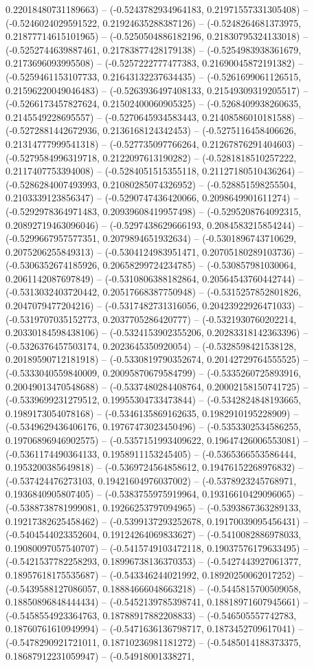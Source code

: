 0.22018480731189663) -- (-0.5243782934964183, 0.21971557331305408) -- (-0.5246024029591522, 0.21924635288387126) -- (-0.5248264681373975, 0.21877714615101965) -- (-0.5250504886182196, 0.21830795324133018) -- (-0.5252744639887461, 0.21783877428179138) -- (-0.5254983938361679, 0.2173696093995508) -- (-0.5257222777477383, 0.21690045872191382) -- (-0.5259461153107733, 0.21643132237634435) -- (-0.5261699061126515, 0.21596220049046483) -- (-0.5263936497408133, 0.21549309319205517) -- (-0.5266173457827624, 0.21502400060905325) -- (-0.5268409938260635, 0.2145549228695557) -- (-0.5270645934583443, 0.21408586010181588) -- (-0.5272881442672936, 0.2136168124342453) -- (-0.5275116458406626, 0.21314777999541318) -- (-0.527735097766264, 0.21267876291404603) -- (-0.5279584996319718, 0.2122097613190282) -- (-0.5281818510257222, 0.2117407753394008) -- (-0.5284051515355118, 0.21127180510436264) -- (-0.5286284007493993, 0.21080285074326952) -- (-0.528851598255504, 0.2103339123856347) -- (-0.5290747436420066, 0.2098649901611274) -- (-0.5292978364971483, 0.20939608419957498) -- (-0.5295208764092315, 0.20892719463096046) -- (-0.5297438629666193, 0.2084583215854244) -- (-0.5299667957577351, 0.2079894651932634) -- (-0.5301896743710629, 0.2075206255849313) -- (-0.5304124983951471, 0.20705180289103736) -- (-0.5306352674185926, 0.20658299724234785) -- (-0.530857981030064, 0.2061142087697849) -- (-0.5310806388182864, 0.20564543760442744) -- (-0.5313032403720442, 0.20517668387750948) -- (-0.5315257852801826, 0.2047079477204216) -- (-0.5317482731316056, 0.20423922926471033) -- (-0.5319707035152773, 0.2037705286420777) -- (-0.5321930760202214, 0.20330184598438106) -- (-0.5324153902355206, 0.20283318142363396) -- (-0.5326376457503174, 0.2023645350920054) -- (-0.5328598421538128, 0.20189590712181918) -- (-0.5330819790352674, 0.20142729764555525) -- (-0.5333040559840009, 0.20095870679584799) -- (-0.5335260725893916, 0.20049013470548688) -- (-0.5337480284408764, 0.20002158150741725) -- (-0.5339699231279512, 0.19955304733473844) -- (-0.5342824848193665, 0.1989173054078168) -- (-0.5346135869162635, 0.1982910195228909) -- (-0.5349629436406176, 0.19767473023450496) -- (-0.5353302534586255, 0.19706896946902575) -- (-0.5357151993409622, 0.19647426006553081) -- (-0.5361174490364133, 0.1958911153245405) -- (-0.5365366553586444, 0.1953200385649818) -- (-0.5369724564858612, 0.19476152268976832) -- (-0.537424476273103, 0.19421604976037002) -- (-0.5378923245768971, 0.1936840905807405) -- (-0.5383755975919964, 0.19316610429096065) -- (-0.5388738781999081, 0.19266253797094965) -- (-0.5393867363289133, 0.19217382625458462) -- (-0.5399137293252678, 0.19170039095456431) -- (-0.5404544023352604, 0.19124264069833627) -- (-0.5410082886978033, 0.19080097057540707) -- (-0.5415749103472118, 0.19037576179633495) -- (-0.5421537782258293, 0.18996738136370353) -- (-0.5427443927061377, 0.18957618175535687) -- (-0.543346244021992, 0.18920250062017252) -- (-0.5439588127086057, 0.18884666048663218) -- (-0.5445815700509058, 0.18850896848444434) -- (-0.5452139785398741, 0.18818971607945661) -- (-0.5458554923364763, 0.18788917882208833) -- (-0.546505557742783, 0.18760761610949994) -- (-0.5471636136798717, 0.1873452709617041) -- (-0.5478290921721011, 0.18710236981181272) -- (-0.5485014188373375, 0.18687912231059947) -- (-0.54918001338271, 